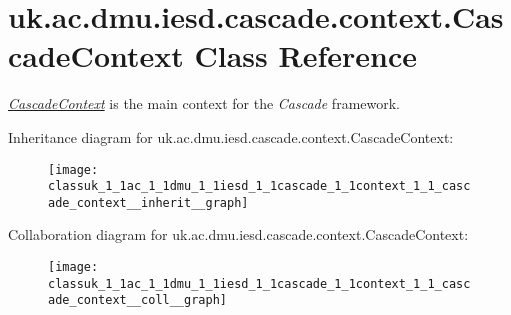 \hypertarget{classuk_1_1ac_1_1dmu_1_1iesd_1_1cascade_1_1context_1_1_cascade_context}{\section{uk.\-ac.\-dmu.\-iesd.\-cascade.\-context.\-Cascade\-Context Class Reference}
\label{classuk_1_1ac_1_1dmu_1_1iesd_1_1cascade_1_1context_1_1_cascade_context}
}


{\itshape \hyperlink{classuk_1_1ac_1_1dmu_1_1iesd_1_1cascade_1_1context_1_1_cascade_context}{Cascade\-Context}} is the main context for the {\itshape Cascade} framework.  




Inheritance diagram for uk.\-ac.\-dmu.\-iesd.\-cascade.\-context.\-Cascade\-Context\-:\nopagebreak
\begin{figure}[H]
\begin{center}
\leavevmode
\texttt{[image: classuk\_1\_1ac\_1\_1dmu\_1\_1iesd\_1\_1cascade\_1\_1context\_1\_1\_cascade\_context\_\_inherit\_\_graph]}
\end{center}
\end{figure}


Collaboration diagram for uk.\-ac.\-dmu.\-iesd.\-cascade.\-context.\-Cascade\-Context\-:\nopagebreak
\begin{figure}[H]
\begin{center}
\leavevmode
\texttt{[image: classuk\_1\_1ac\_1\_1dmu\_1\_1iesd\_1\_1cascade\_1\_1context\_1\_1\_cascade\_context\_\_coll\_\_graph]}
\end{center}
\end{figure}
